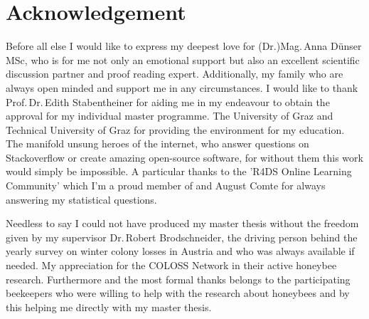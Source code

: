 \chapter*{Acknowledgement}
\label{sec:acknowledgement}
\vspace*{-10mm}

Before all else I would like to express my deepest love for (Dr.)Mag.\,Anna Dünser\,MSc, who is for me not only an emotional support but also an excellent scientific discussion partner and proof reading expert. Additionally, my family who are always open minded and support me in any circumstances. I would like to thank Prof.\,Dr.\,Edith Stabentheiner for aiding me in my endeavour to obtain the approval for my individual master programme. The University of Graz and Technical University of Graz for providing the environment for my education. The manifold unsung heroes of the internet, who answer questions on Stackoverflow or create amazing open-source software, for without them this work would simply be impossible. A particular thanks to the 'R4DS Online Learning Community' which I'm a proud member of and August Comte for always answering my statistical questions.

Needless to say I could not have produced my master thesis without the freedom given by my supervisor Dr.\,Robert Brodschneider, the driving person behind the yearly survey on winter colony losses in Austria and who was always available if needed. My appreciation for the COLOSS Network in their active honeybee research. Furthermore and the most formal thanks belongs to the participating beekeepers who were willing to help with the research about honeybees and by this helping me directly with my master thesis.
